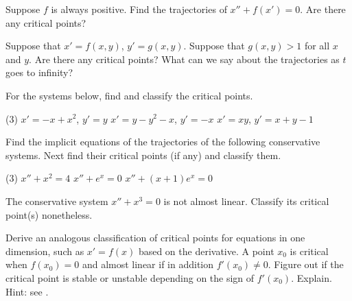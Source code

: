 \begin{exercise}
Suppose $f$ is always positive.
Find the trajectories of $x''+f(x') = 0$.
Are there any critical points?
\end{exercise}

\begin{exercise}
Suppose that $x' = f(x,y)$, $y' = g(x,y)$.  Suppose that $g(x,y) > 1$ for
all $x$ and $y$.  Are there any critical points?  What can we say about the
trajectories as $t$ goes to infinity?
\end{exercise}

\setcounter{exercise}{100}

\begin{exercise}
For the systems below, find and classify the critical points.
\begin{tasks}(3)
\task $x'=-x+x^2$, $y'=y$
\task $x'=y-y^2-x$, $y'=-x$
\task $x'=xy$, $y'=x+y-1$
\end{tasks}
\end{exercise}

\begin{exercise}
Find the implicit equations of the trajectories of the following
conservative systems.  Next find their critical points (if any) and classify them.
\begin{tasks}(3)
\task $x''+ x^2 = 4$
\task $x''+ e^x = 0$
\task $x''+ (x+1)e^x = 0$
\end{tasks}
\end{exercise}

\begin{exercise}
The conservative system $x''+x^3 = 0$ is not almost linear.  Classify
its critical point(s) nonetheless.
\end{exercise}

\begin{exercise}
Derive an analogous classification of critical points for equations in one dimension,
such as $x'= f(x)$ based on the derivative.  A point $x_0$ is critical when $f(x_0) = 0$ and
almost linear if in addition $f'(x_0) \neq 0$.  Figure out if the critical point is stable or unstable
depending on the sign of $f'(x_0)$.  Explain.  Hint: see .
\end{exercise}

